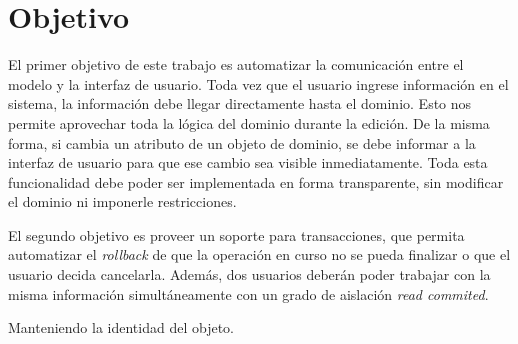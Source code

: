 \section{Objetivo}
\label{sec:Objetivo}
El primer objetivo de este trabajo es automatizar la comunicación entre el
modelo y la interfaz de usuario.
Toda vez que el usuario ingrese información en el sistema, la
información debe llegar directamente hasta el dominio. Esto nos permite
aprovechar toda la lógica del dominio durante la edición.
De la misma forma, si cambia un atributo de un objeto de dominio, se debe
informar a la interfaz de usuario para que ese cambio sea visible
inmediatamente.
Toda esta funcionalidad debe poder ser implementada en forma transparente,
sin modificar el dominio ni imponerle restricciones.

El segundo objetivo es proveer un soporte para transacciones, que
permita automatizar el \emph{rollback} de que la operación en curso no se pueda
finalizar o que el usuario decida cancelarla.
Además, dos usuarios deberán poder trabajar con la misma información
simultáneamente con un grado de aislación \emph{read commited}.

 Manteniendo la identidad del objeto.
